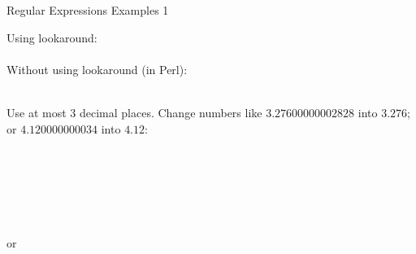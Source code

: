 \documentclass[11pt, a4paper, landscape]{scrartcl}
\newcommand{\regex}[1]{\texttt{#1}}
\newcommand{\cregex}[1]{\colorbox{gray!30}{\regex{#1}}}
\newcommand{\reshortexample}[1]{\cregex{}}
\newcommand{\relongexample}[1]{\regex{}}
\begin{document}
\begin{cheatsheet}{Regular Expressions Examples 1}
\begin{col2}
Using lookaround:\\
\reshortexample{./thousandsep_1.tex}\\

Without using lookaround (in Perl):\\
\relongexample{./thousandsep_2.tex}\\


Use at most $3$ decimal places. Change numbers like $3.27600000002828$ into
$3.276$; or $4.120000000034$ into $4.12$:\\
\reshortexample{./fixfloat.tex}\\

\end{col2}

\begin{col3}


\relongexample{./date.tex}\\


\reshortexample{./time12.tex}\\


\reshortexample{./time24_1.tex}\\
or\\
\reshortexample{./time24_2.tex}\\

\end{col3}

\end{cheatsheet}

\newpage
\end{document}
